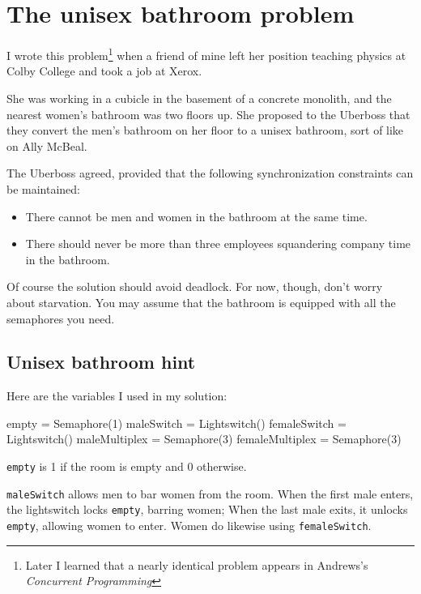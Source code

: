 \documentclass{book}
\begin{document}
\section{The unisex bathroom problem}

I wrote this problem\footnote{Later I learned that a nearly
identical problem appears in Andrews's
{\em Concurrent Programming}\cite{andrews}} when a friend of mine
left her position teaching physics at Colby College
and took a job at Xerox.

She was working in a cubicle in the basement of a
concrete monolith, and the nearest women's bathroom was two floors up.
She proposed to the Uberboss that they convert the men's bathroom
on her floor to a unisex bathroom, sort of like on Ally McBeal.

The Uberboss agreed, provided that the following synchronization
constraints can be maintained:

\begin {itemize}

\item There cannot be men and women in the bathroom
at the same time.

\item There should never be more than three
employees squandering company time in the bathroom.

\end{itemize}

Of course the solution should avoid deadlock.  For now, though, don't
worry about starvation.  You may assume that the bathroom is equipped
with all the semaphores you need.



\subsection {Unisex bathroom hint}

Here are the variables I used in my solution:

\begin{unbreakable}[title={Unisex bathroom hint}]{}
empty = Semaphore(1)
maleSwitch = Lightswitch()
femaleSwitch = Lightswitch()
maleMultiplex = Semaphore(3)
femaleMultiplex = Semaphore(3)
\end{unbreakable}

{\tt empty} is 1 if the room is empty and 0 otherwise.

    {\tt maleSwitch} allows men to bar women from the room.
When the first male enters, the lightswitch locks {\tt empty}, barring women;
When the last male exits, it unlocks {\tt empty}, allowing women
to enter.  Women do likewise using {\tt femaleSwitch}.
\end{document}
